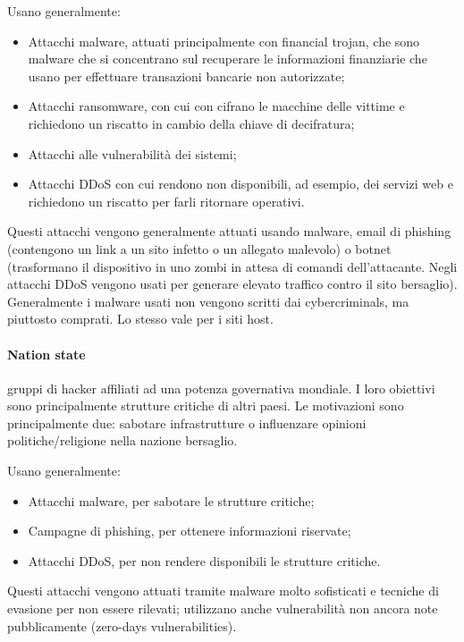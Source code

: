 \noindent Usano generalmente:
\begin{itemize}
    \item Attacchi malware, attuati principalmente con financial trojan, che sono malware che si concentrano sul recuperare le informazioni finanziarie che usano per effettuare transazioni bancarie non autorizzate;
    \item Attacchi ransomware, con cui con cifrano le macchine delle vittime e richiedono un riscatto in cambio della chiave di decifratura;
    \item Attacchi alle vulnerabilità dei sistemi;
    \item Attacchi DDoS con cui rendono non disponibili, ad esempio, dei servizi web e richiedono un riscatto per farli ritornare operativi.
\end{itemize}

\noindent Questi attacchi vengono generalmente attuati usando malware, email di phishing (contengono un link a un sito infetto o un allegato malevolo) o botnet (trasformano il dispositivo in uno zombi in attesa di comandi dell'attacante. Negli attacchi DDoS vengono usati per generare elevato traffico contro il sito bersaglio). Generalmente i malware usati non vengono scritti dai cybercriminals, ma piuttosto comprati. Lo stesso vale per i siti host. 
    
\paragraph{Nation state} gruppi di hacker affiliati ad una potenza governativa mondiale. I loro obiettivi sono principalmente strutture critiche di altri paesi. Le motivazioni sono principalmente due: sabotare infrastrutture o influenzare opinioni politiche/religione nella nazione bersaglio.

\noindent Usano generalmente:
\begin{itemize}
    \item Attacchi malware, per sabotare le strutture critiche;
    \item Campagne di phishing, per ottenere informazioni riservate;
    \item Attacchi DDoS, per non rendere disponibili le strutture critiche.
\end{itemize}

\noindent Questi attacchi vengono attuati tramite malware molto sofisticati e tecniche di evasione per non essere rilevati; utilizzano anche vulnerabilità non ancora note pubblicamente (zero-days vulnerabilities).
    
